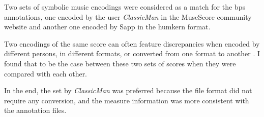 
Two sets of symbolic music encodings were considered as a
match for the \gls{bps} annotations, one encoded by the user
\emph{ClassicMan} in the MuseScore community
website
and another one encoded by Sapp in the \gls{humkern}
format.

Two encodings of the same score can often feature
discrepancies when encoded by different persons, in
different formats, or converted from one format to another
\parencite{napoleslopez2018encoding,
napoleslopez2019effects}. I found that to be the case
between these two sets of scores when they were compared
with each
other.

In the end, the set by \emph{ClassicMan} was preferred
because the file format did not require any conversion, and
the measure information was more consistent with the
annotation files.